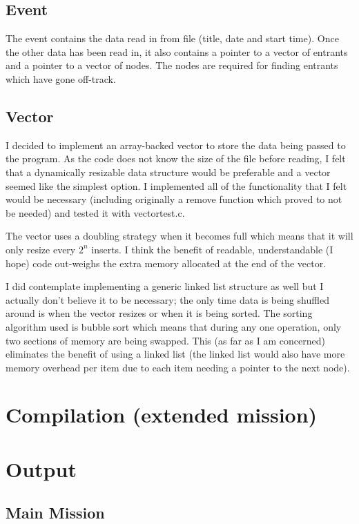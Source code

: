 \documentclass[a4paper, twoside]{article}
\begin{document}
\subsection{Event}
The event contains the data read in from file (title, date and start time).
Once the other data has been read in, it also contains a pointer to a vector
of entrants and a pointer to a vector of nodes. The nodes are required for
finding entrants which have gone off-track.

\subsection{Vector}
I decided to implement an array-backed vector to store the data being passed to
the program. As the code does not know the size of the file before reading, I
felt that a dynamically resizable data structure would be preferable and a
vector seemed like the simplest option. I implemented all of the functionality
that I felt would be necessary (including originally a remove function which
proved to not be needed) and tested it with vectortest.c.

The vector uses a doubling strategy when it becomes full which means that it
will only resize every $2^n$ inserts. I think the benefit of readable,
understandable (I hope) code out-weighs the extra memory allocated at the
end of the vector.

I did contemplate implementing a generic linked list structure as well but I
actually don't believe it to be necessary; the only time data is being shuffled
around is when the vector resizes or when it is being sorted. The sorting
algorithm used is bubble sort which means that during any one operation, only
two sections of memory are being swapped. This (as far as I am concerned)
eliminates the benefit of using a linked list (the linked list would also have
more memory overhead per item due to each item needing a pointer to the next
node).

\newpage
\section{Compilation (extended mission)}


\newpage
\section{Output}
\subsection{Main Mission}
\end{document}
